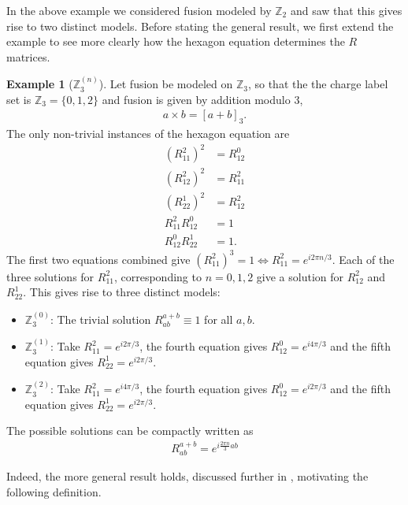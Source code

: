 \documentclass[a4paper,10pt,oneside]{book}
\theoremstyle{plain}
\theoremstyle{definition}
\newtheorem{example}{Example}[section]
\theoremstyle{remark}
\begin{document}
In the above example we considered fusion modeled by $\mathbb{Z}_2$ and saw that this gives rise to two distinct models. Before stating the general result, we first extend the example to see more clearly how the hexagon equation determines the $R$ matrices.

\begin{example}[$\mathbb{Z}_3^{(n)}$]
  Let fusion be modeled on $\mathbb{Z}_3$, so that the the charge label set is $\mathbb{Z}_3 = \{0, 1, 2\}$ and fusion is given by addition modulo 3,
  \begin{align*}
    a \times b = [a + b]_3.
  \end{align*}
  The only non-trivial instances of the hexagon equation are
  \begin{align*}
    \left( R_{11}^2 \right)^2 &= R_{12}^0 \\
    \left( R_{12}^2 \right)^2 &= R_{11}^2 \\
    \left( R_{22}^1 \right)^2 &= R_{12}^2 \\
    R_{11}^2 R_{12}^0 &= 1 \\
    R_{12}^0 R_{22}^1 &= 1.
  \end{align*}
  The first two equations combined give $\left( R_{11}^2 \right)^3 = 1 \iff R_{11}^2 = e^{i2πn/3}$. Each of the three solutions for $R_{11}^2$, corresponding to $n = 0, 1, 2$ give a solution for $R_{12}^2$ and $R_{22}^1$. This gives rise to three distinct models:
  \begin{itemize}
    \item $\mathbb{Z}_3^{(0)}$: The trivial solution $R_{ab}^{a+b} \equiv 1$ for all $a, b$.
    \item $\mathbb{Z}_3^{(1)}$: Take $R_{11}^2 = e^{i2π/3}$, the fourth equation gives $R_{12}^0 = e^{i4π/3}$ and the fifth equation gives $R_{22}^1 = e^{i2π/3}$.
    \item $\mathbb{Z}_3^{(2)}$: Take $R_{11}^2 = e^{i4π/3}$, the fourth equation gives $R_{12}^0 = e^{i2π/3}$ and the fifth equation gives $R_{22}^1 = e^{i2π/3}$.
  \end{itemize}
  The possible solutions can be compactly written as
  \begin{align*}
    R_{ab}^{a+b} = e^{i\frac{2πn}{3}ab}
  \end{align*}
\end{example}

Indeed, the more general result holds, discussed further in \cite{bonderson}, motivating the following definition.
\end{document}
